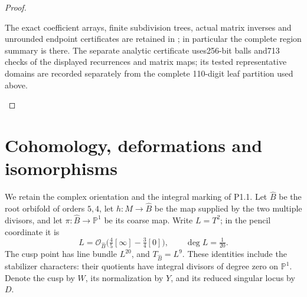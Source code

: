 \begin{proof}
\begin{enumerate}[label=\arabic*.]
The exact coefficient arrays, finite subdivision trees, actual
matrix inverses and unrounded endpoint certificates are retained
in ; in particular the complete
region summary is
 there.
The separate analytic certificate uses256-bit balls and713
checks of the displayed recurrences and matrix maps; its tested
representative domains are recorded separately from the complete
110-digit leaf partition used above.
\end{enumerate}
\end{proof}


\section{Cohomology, deformations and isomorphisms}

We retain the complex orientation and the integral marking of P1.1.
Let $\widehat B$ be the root orbifold of orders $5,4$, let
$h:M\to\widehat B$ be the map supplied by the two multiple divisors,
and let $\pi:\widehat B\to\mathbb P^1$ be its coarse map.
Write $L=T^2$; in the pencil coordinate it is
\[
 L=\mathcal O_{\widehat B}\bigl(\tfrac45[\infty]
                  -\tfrac34[0]\bigr),\qquad \deg L=\tfrac1{20}.
\]
The cusp point has line bundle $L^{20}$, and
$T_{\widehat B}=L^9$. These identities include the stabilizer
characters: their quotients have integral divisors of degree zero
on $\mathbb P^1$. Denote the cusp by $W$, its normalization by $Y$,
and its reduced singular locus by $D$.

